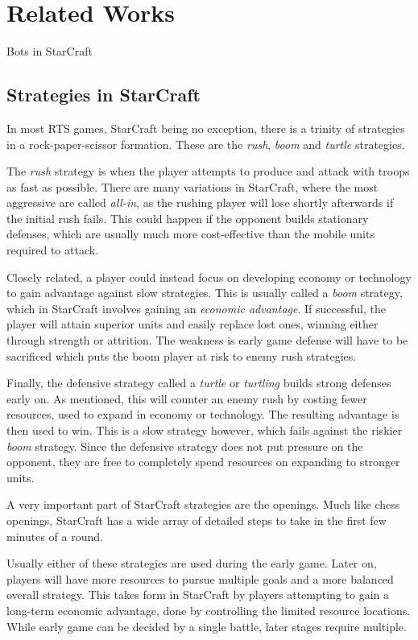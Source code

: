 \chapter{Related Works}
Bots in StarCraft

\section{Strategies in StarCraft}
In most RTS games, StarCraft being no exception, there is a trinity of strategies in a rock-paper-scissor formation. These are the \emph{rush}, \emph{boom} and \emph{turtle} strategies.

The \emph{rush} strategy is when the player attempts to produce and attack with troops as fast as possible. There are many variations in StarCraft, where the most aggressive are called \emph{all-in}, as the rushing player will lose shortly afterwards if the initial rush fails. This could happen if the opponent builds stationary defenses, which are usually much more cost-effective than the mobile units required to attack.

Closely related, a player could instead focus on developing economy or technology to gain advantage against slow strategies. This is usually called a \emph{boom} strategy, which in StarCraft involves gaining an \emph{economic advantage}. If successful, the player will attain superior units and easily replace lost ones, winning either through strength or attrition. The weakness is early game defense will have to be sacrificed which puts the boom player at risk to enemy rush strategies.

Finally, the defensive strategy called a \emph{turtle} or \emph{turtling} builds strong defenses early on. As mentioned, this will counter an enemy rush by costing fewer resources, used to expand in economy or technology. The resulting advantage is then used to win. This is a slow strategy however, which fails against the riskier \emph{boom} strategy. Since the defensive strategy does not put pressure on the opponent, they are free to completely spend resources on expanding to stronger units.

A very important part of StarCraft strategies are the openings. Much like chess openings, StarCraft has a wide array of detailed steps to take in the first few minutes of a round.

Usually either of these strategies are used during the early game. Later on, players will have more resources to pursue multiple goals and a more balanced overall strategy. This takes form in StarCraft by players attempting to gain a long-term economic advantage, done by controlling the limited resource locations. While early game can be decided by a single battle, later stages require multiple.

